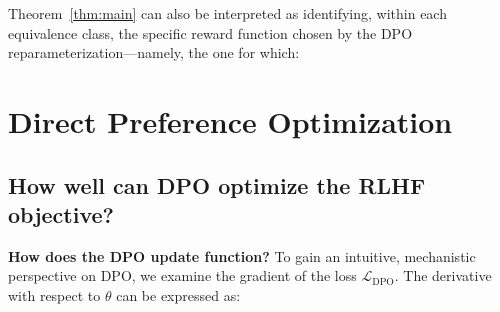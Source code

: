 Theorem~\ref{thm:main} can also be interpreted as identifying, within each equivalence class, the specific reward function chosen by the DPO reparameterization—namely, the one for which:

\section{Direct Preference Optimization}\label{sec:DPO}

\subsection{How well can DPO optimize the RLHF objective?}

\textbf{How does the DPO update function?} To gain an intuitive, mechanistic perspective on DPO, we examine the gradient of the loss $\mathcal{L}_\text{DPO}$. The derivative with respect to $\theta$ can be expressed as:

